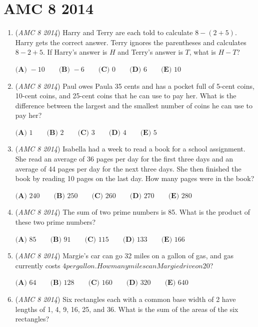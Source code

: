 \section{AMC 8 2014}
        \begin{enumerate}
        	\item (\textit{AMC 8 2014}) Harry and Terry are each told to calculate $8 - (2 + 5)$. Harry gets the correct answer. Terry ignores the parentheses and calculates $8 - 2 + 5$. If Harry's answer is $H$ and Terry's answer is $T$, what is $H - T$?


 $\textbf{(A) }-10\qquad\textbf{(B) }-6\qquad\textbf{(C) }0\qquad\textbf{(D) }6\qquad \textbf{(E) }10$


	\item (\textit{AMC 8 2014}) Paul owes Paula 35 cents and has a pocket full of 5-cent coins, 10-cent coins, and 25-cent coins that he can use to pay her. What is the difference between the largest and the smallest number of coins he can use to pay her?


 $\textbf{(A) }1\qquad\textbf{(B) }2\qquad\textbf{(C) }3\qquad\textbf{(D) }4\qquad \textbf{(E) }5$


	\item (\textit{AMC 8 2014}) Isabella had a week to read a book for a school assignment. She read an average of 36 pages per day for the first three days and an average of 44 pages per day for the next three days. She then finished the book by reading 10 pages on the last day. How many pages were in the book?


 $\textbf{(A) }240\qquad\textbf{(B) }250\qquad\textbf{(C) }260\qquad\textbf{(D) }270\qquad \textbf{(E) }280$


	\item (\textit{AMC 8 2014}) The sum of two prime numbers is 85. What is the product of these two prime numbers?


 $\textbf{(A) }85\qquad\textbf{(B) }91\qquad\textbf{(C) }115\qquad\textbf{(D) }133\qquad \textbf{(E) }166$


	\item (\textit{AMC 8 2014}) Margie's car can go 32 miles on a gallon of gas, and gas currently costs $4 per gallon. How many miles can Margie drive on $20?


 $\textbf{(A) }64\qquad\textbf{(B) }128\qquad\textbf{(C) }160\qquad\textbf{(D) }320\qquad\textbf{(E) }640$


	\item (\textit{AMC 8 2014}) Six rectangles each with a common base width of 2 have lengths of 1, 4, 9, 16, 25, and 36. What is the sum of the areas of the six rectangles?



\end{enumerate}
